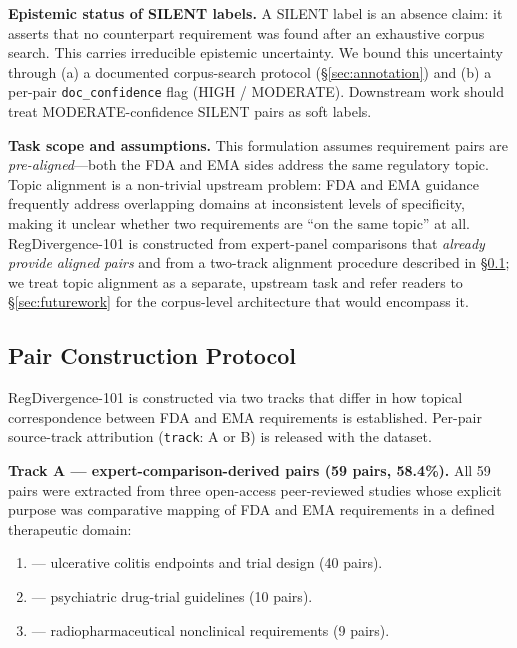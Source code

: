 \documentclass[manuscript]{acmart}
\begin{document}
\textbf{Epistemic status of SILENT labels.}
A SILENT label is an absence claim: it asserts that no counterpart requirement
was found after an exhaustive corpus search. This carries irreducible epistemic
uncertainty. We bound this uncertainty through (a) a documented corpus-search
protocol (\S\ref{sec:annotation}) and (b) a per-pair \texttt{doc\_confidence}
flag (HIGH / MODERATE). Downstream work should treat MODERATE-confidence SILENT
pairs as soft labels.

\textbf{Task scope and assumptions.} This formulation assumes requirement pairs
are \textit{pre-aligned}---both the FDA and EMA sides address the same
regulatory topic. Topic alignment is a non-trivial upstream problem: FDA and
EMA guidance frequently address overlapping domains at inconsistent levels of
specificity, making it unclear whether two requirements are ``on the same
topic'' at all. RegDivergence-101 is constructed from expert-panel comparisons
that \textit{already provide aligned pairs} and from a two-track alignment
procedure described in \S\ref{sec:dataset}; we treat topic alignment as a
separate, upstream task and refer readers to \S\ref{sec:futurework} for the
corpus-level architecture that would encompass it.

\subsection{Pair Construction Protocol}
\label{sec:dataset}

RegDivergence-101 is constructed via two tracks that differ in how topical
correspondence between FDA and EMA requirements is established. Per-pair
source-track attribution (\texttt{track}: A or B) is released with the dataset.

\textbf{Track A --- expert-comparison-derived pairs (59 pairs, 58.4\%).}
All 59 pairs were extracted from three open-access peer-reviewed studies whose
explicit purpose was comparative mapping of FDA and EMA requirements in a
defined therapeutic domain:

\begin{enumerate}
\item \citet{uc2025jcc} --- ulcerative colitis endpoints and trial design
  (40 pairs).
\item \citet{pmc8157504} --- psychiatric drug-trial guidelines (10 pairs).
\item \citet{pmc6529498} --- radiopharmaceutical nonclinical requirements
  (9 pairs).
\end{enumerate}
\end{document}
